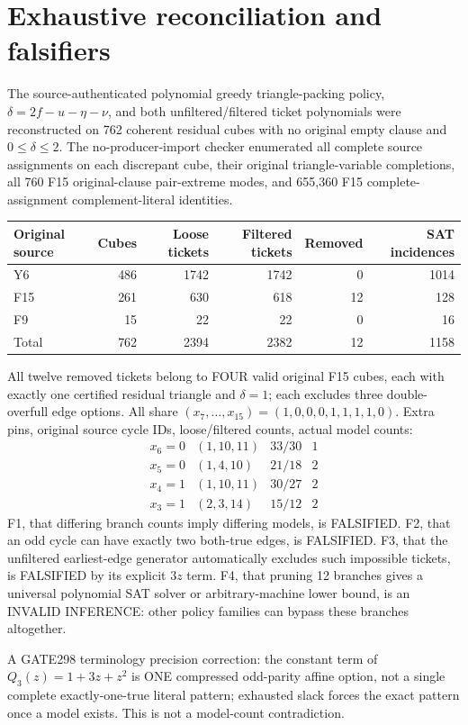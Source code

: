 \documentclass[11pt]{article}
\begin{document}
\section*{Exhaustive reconciliation and falsifiers}
The source-authenticated polynomial greedy triangle-packing policy, $\delta=2f-u-\eta-\nu$, and both unfiltered/filtered ticket polynomials were reconstructed on 762 coherent residual cubes with no original empty clause and $0\le\delta\le2$. The no-producer-import checker enumerated all complete source assignments on each discrepant cube, their original triangle-variable completions, all 760 F15 original-clause pair-extreme modes, and 655,360 F15 complete-assignment complement-literal identities.
\begin{center}\begin{tabular}{lrrrrr}\toprule
Original source&Cubes&Loose tickets&Filtered tickets&Removed&SAT incidences\\\midrule
Y6&486&1742&1742&0&1014\\
F15&261&630&618&12&128\\
F9&15&22&22&0&16\\\midrule
Total&762&2394&2382&12&1158\\\bottomrule
\end{tabular}\end{center}
All twelve removed tickets belong to FOUR valid original F15 cubes, each with exactly one certified residual triangle and $\delta=1$; each excludes three double-overfull edge options. All share $(x_7,\ldots,x_{15})=(1,0,0,0,1,1,1,1,0)$. Extra pins, original source cycle IDs, loose/filtered counts, actual model counts:
\[
\begin{array}{c|c|c|c}
x_6=0&(1,10,11)&33/30&1\\
x_5=0&(1,4,10)&21/18&2\\
x_4=1&(1,10,11)&30/27&2\\
x_3=1&(2,3,14)&15/12&2
\end{array}
\]
F1, that differing branch counts imply differing models, is FALSIFIED. F2, that an odd cycle can have exactly two both-true edges, is FALSIFIED. F3, that the unfiltered earliest-edge generator automatically excludes such impossible tickets, is FALSIFIED by its explicit $3z$ term. F4, that pruning 12 branches gives a universal polynomial SAT solver or arbitrary-machine lower bound, is an INVALID INFERENCE: other policy families can bypass these branches altogether.
\par\noindent A GATE298 terminology precision correction: the constant term of $Q_3(z)=1+3z+z^2$ is ONE compressed odd-parity affine option, not a single complete exactly-one-true literal pattern; exhausted slack forces the exact pattern once a model exists. This is not a model-count contradiction.
\end{document}
